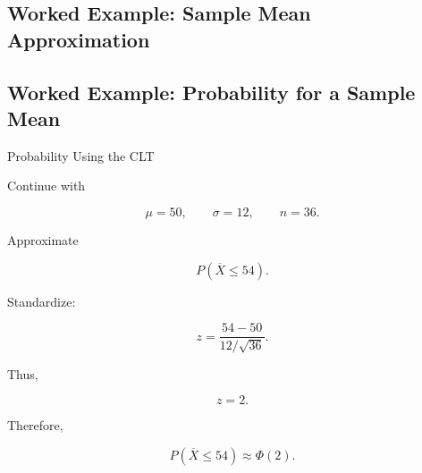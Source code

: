 \subsection{Worked Example: Sample Mean Approximation}
\label{subsec:worked-clt-sample-mean}


\subsection{Worked Example: Probability for a Sample Mean}
\label{subsec:worked-clt-sample-mean-probability}

\begin{workedexamplebox}{Probability Using the CLT}

Continue with

\[
\mu=50,
\qquad
\sigma=12,
\qquad
n=36.
\]

Approximate

\[
P(\overline{X}\leq54).
\]

Standardize:

\[
z
=
\frac{
54-50
}{
12/\sqrt{36}
}.
\]

Thus,

\[
z=2.
\]

Therefore,

\begin{answerbox}
\[
\boxed{
P(\overline{X}\leq54)
\approx
\Phi(2).
}
\]
\end{answerbox}

\end{workedexamplebox}

